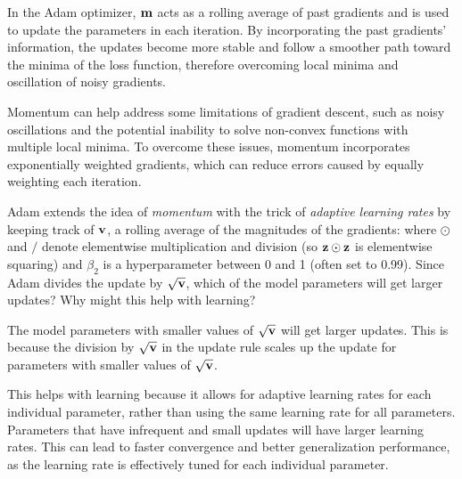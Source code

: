 \begin{parts}
\begin{subparts}
                \begin{answer}
                In the Adam optimizer, $\mathbf{m}$ acts as a rolling average of past gradients and is used to update the parameters in each iteration. By incorporating the past gradients' information, the updates become more stable and follow a smoother path toward the minima of the loss function, therefore overcoming local minima and oscillation of noisy gradients.

                Momentum can help address some limitations of gradient descent, such as noisy oscillations and the potential inability to solve non-convex functions with multiple local minima. To overcome these issues, momentum incorporates exponentially weighted gradients, which can reduce errors caused by equally weighting each iteration.
                \end{answer} \newline

                
            \subpart[2] Adam extends the idea of {\it momentum} with the trick of {\it adaptive learning rates} by keeping track of  $\mathbf{v}$, a rolling average of the magnitudes of the gradients:
                where $\odot$ and $/$ denote elementwise multiplication and division (so $\mathbf{z} \odot \mathbf{z}$ is elementwise squaring) and $\beta_2$ is a hyperparameter between 0 and 1 (often set to  0.99). Since Adam divides the update by $\sqrt{\mathbf{v}}$, which of the model parameters will get larger updates?  Why might this help with learning?

                \begin{answer}
                The model parameters with smaller values of $\sqrt{\mathbf{v}}$ will get larger updates. This is because the division by $\sqrt{\mathbf{v}}$ in the update rule scales up the update for parameters with smaller values of $\sqrt{\mathbf{v}}$.

                This helps with learning because it allows for adaptive learning rates for each individual parameter, rather than using the same learning rate for all parameters. Parameters that have infrequent and small updates will have larger learning rates. This can lead to faster convergence and better generalization performance, as the learning rate is effectively tuned for each individual parameter.
                

\end{answer}
\end{subparts}
\end{parts}
